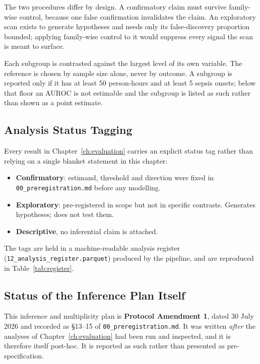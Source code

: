 The two procedures differ by design. A confirmatory claim must survive
family-wise control, because one false confirmation invalidates the claim. An
exploratory scan exists to generate hypotheses and needs only its
false-discovery proportion bounded; applying family-wise control to it would
suppress every signal the scan is meant to surface.

Each subgroup is contrasted against the largest level of its own variable. The
reference is chosen by sample size alone, never by outcome. A subgroup is
reported only if it has at least 50 person-hours and at least 5 sepsis onsets;
below that floor an AUROC is not estimable and the subgroup is listed as such
rather than shown as a point estimate.

\subsection{Analysis Status Tagging}

Every result in Chapter~\ref{ch:evaluation} carries an explicit status tag
rather than relying on a single blanket statement in this chapter:

\begin{itemize}
    \item \textbf{Confirmatory}: estimand, threshold and direction were
          fixed in \texttt{00\_preregistration.md} before any modelling.
    \item \textbf{Exploratory}: pre-registered in scope but not in specific
          contrasts. Generates hypotheses; does not test them.
    \item \textbf{Descriptive}, no inferential claim is attached.
\end{itemize}

The tags are held in a machine-readable analysis register
(\texttt{12\_analysis\_register.parquet}) produced by the pipeline, and are
reproduced in Table~\ref{tab:register}.

\subsection{Status of the Inference Plan Itself}

This inference and multiplicity plan is \textbf{Protocol Amendment 1}, dated
30 July 2026 and recorded as \S13--15 of
\texttt{00\_preregistration.md}. It was written \emph{after} the analyses of
Chapter~\ref{ch:evaluation} had been run and inspected, and it is therefore
itself post-hoc. It is reported as such rather than presented as
pre-specification.

